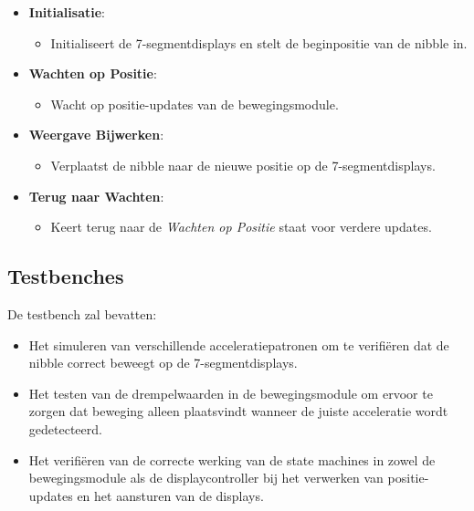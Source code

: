\documentclass{article}
\begin{document}
\begin{itemize}
    \item \textbf{Initialisatie}:
    \begin{itemize}
        \item Initialiseert de 7-segmentdisplays en stelt de beginpositie van de nibble in.
    \end{itemize}
    \item \textbf{Wachten op Positie}:
    \begin{itemize}
        \item Wacht op positie-updates van de bewegingsmodule.
    \end{itemize}
    \item \textbf{Weergave Bijwerken}:
    \begin{itemize}
        \item Verplaatst de nibble naar de nieuwe positie op de 7-segmentdisplays.
    \end{itemize}
    \item \textbf{Terug naar Wachten}:
    \begin{itemize}
        \item Keert terug naar de \textit{Wachten op Positie} staat voor verdere updates.
    \end{itemize}
\end{itemize}

\subsection*{Testbenches}

De testbench zal bevatten:

\begin{itemize}
    \item Het simuleren van verschillende acceleratiepatronen om te verifiëren dat de nibble correct beweegt op de 7-segmentdisplays.
    \item Het testen van de drempelwaarden in de bewegingsmodule om ervoor te zorgen dat beweging alleen plaatsvindt wanneer de juiste acceleratie wordt gedetecteerd.
    \item Het verifiëren van de correcte werking van de state machines in zowel de bewegingsmodule als de displaycontroller bij het verwerken van positie-updates en het aansturen van de displays.
\end{itemize}


\end{document}
